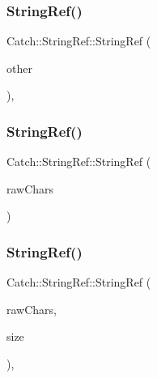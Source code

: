 \mbox{\label{class_catch_1_1_string_ref_a407d5737b94e5a374add5c2794589733}} 
\subsubsection{\texorpdfstring{StringRef()}{StringRef()}\hspace{0.1cm}{\footnotesize\ttfamily [3/6]}}
{\footnotesize\ttfamily Catch\+::\+String\+Ref\+::\+String\+Ref (\begin{DoxyParamCaption}\item[{\mbox{\hyperlink{class_catch_1_1_string_ref}{String\+Ref}} \&\&}]{other }\end{DoxyParamCaption})\hspace{0.3cm}{\ttfamily [inline]}, {\ttfamily [noexcept]}}

\mbox{\label{class_catch_1_1_string_ref_aea45f5089c53adac362bff6bd7c40943}} 
\subsubsection{\texorpdfstring{StringRef()}{StringRef()}\hspace{0.1cm}{\footnotesize\ttfamily [4/6]}}
{\footnotesize\ttfamily Catch\+::\+String\+Ref\+::\+String\+Ref (\begin{DoxyParamCaption}\item[{char const $\ast$}]{raw\+Chars }\end{DoxyParamCaption})\hspace{0.3cm}{\ttfamily [noexcept]}}

\mbox{\label{class_catch_1_1_string_ref_a320bf235274ebb90dd6af80485af2797}} 
\subsubsection{\texorpdfstring{StringRef()}{StringRef()}\hspace{0.1cm}{\footnotesize\ttfamily [5/6]}}
{\footnotesize\ttfamily Catch\+::\+String\+Ref\+::\+String\+Ref (\begin{DoxyParamCaption}\item[{char const $\ast$}]{raw\+Chars,  }\item[{\mbox{\hyperlink{class_catch_1_1_string_ref_a06b4db8fc82b197004291cf370b2ba7c}{size\+\_\+type}}}]{size }\end{DoxyParamCaption})\hspace{0.3cm}{\ttfamily [inline]}, {\ttfamily [noexcept]}}


